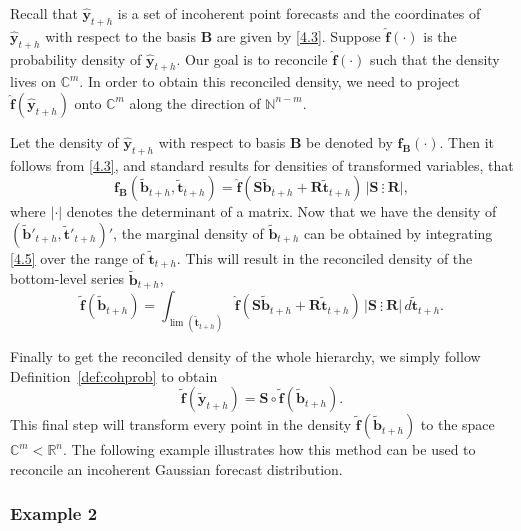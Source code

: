 \documentclass[a4paper, 11pt]{article}
\begin{document}
Recall that $\hat{\bm{y}}_{t+h}$ is a set of incoherent point forecasts and the coordinates of $\hat{\bm{y}}_{t+h}$ with respect to the basis $\bm{B}$ are given by \eqref{4.3}. Suppose $\hat{\bm{f}}(\cdot)$ is the probability density of $\hat{\bm{y}}_{t+h}$. Our goal is to reconcile $\hat{\bm{f}}(\cdot)$ such that the density lives on $\mathbb{C}^m$. In order to obtain this reconciled density, we need to project $\hat{\bm{f}}(\hat{\bm{y}}_{t+h})$ onto $\mathbb{C}^m$ along the direction of $\mathbb{N}^{n-m}$.

Let the density of $\hat{\bm{y}}_{t+h}$ with respect to basis $\bm{B}$ be denoted by $\bm{f_B}(\cdot)$. Then it follows from  \eqref{4.3}, and standard results for densities of transformed variables, that
\begin{equation}\label{4.5}
\bm{f_B}(\tilde{\bm{b}}_{t+h},\tilde{\bm{t}}_{t+h})=\hat{\bm{f}}(\bm{S}\tilde{\bm{b}}_{t+h}+\bm{R}\tilde{\bm{t}}_{t+h}) \,\Big|\bm{S} ~ \vdots~ \bm{R}\Big|,
\end{equation}
where $|\cdot|$ denotes the determinant of a matrix. Now that we have the density of $(\tilde{\bm{b}}'_{t+h} , \tilde{\bm{t}}'_{t+h})'$, the marginal density of $\tilde{\bm{b}}_{t+h}$ can be obtained by integrating \eqref{4.5} over the range of $\tilde{\bm{t}}_{t+h}$. This will result in the reconciled density of the bottom-level series $\tilde{\bm{b}}_{t+h}$,
\begin{equation}\label{4.6}
\tilde{\bm{f}}(\tilde{\bm{b}}_{t+h})=\int_{\lim(\tilde{\bm{t}}_{t+h})}\hat{\bm{f}}(\bm{S}\tilde{\bm{b}}_{t+h}+\bm{R}\tilde{\bm{t}}_{t+h})\,  \Big|\bm{S} ~ \vdots~ \bm{R}\Big| \, d\tilde{\bm{t}}_{t+h}.
\end{equation}

Finally to get the reconciled density of the whole hierarchy, we simply follow Definition~\ref{def:cohprob} to obtain
\begin{equation}\label{4.7}
\tilde{\bm{f}}(\tilde{\bm{y}}_{t+h})=\bm{S}\circ \tilde{\bm{f}}(\tilde{\bm{b}}_{t+h}).
\end{equation}
This final step will transform every point in the density $\tilde{\bm{f}}(\tilde{\bm{b}}_{t+h})$ to the space $\mathbb{C}^m<\mathbb{R}^n$. The following example illustrates how this method can be used to reconcile an incoherent Gaussian forecast distribution.

\subsubsection*{Example 2}
\end{document}
